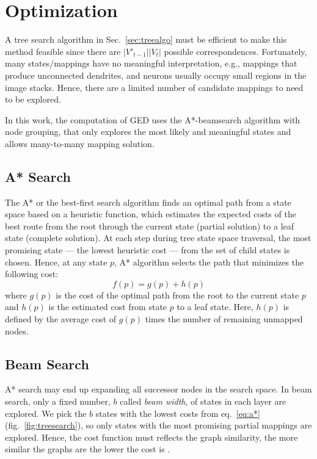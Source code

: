 \documentclass{article}
\begin{document}
\section{Optimization} 
A tree search algorithm in Sec.~\ref{sec:treealgo} must be efficient to make this method feasible since there are $|V'_{t-1}||V_t|$ possible correspondences. Fortunately, many states/mappings have no meaningful interpretation, e.g., mappings that produce unconnected dendrites, and neurons usually occupy small regions in the image stacks. Hence, there are a limited number of candidate mappings to need to be explored. 

In this work, the computation of GED uses the A*-beamsearch algorithm \cite{Neuhaus2006} with node grouping, that only explores the most likely and meaningful states and allows many-to-many mapping solution.

\subsection{A* Search}
The A* or the best-first search algorithm \cite{hart1968} finds an optimal path from a state space based on a heuristic function, which estimates the expected costs of the best route from the root through the current state (partial solution) to a leaf state (complete solution). At each step during tree state space traversal, the most promising state --- the lowest heuristic cost --- from the set of child states is chosen. Hence, at any state $p$, A* algorithm selects the path that minimizes the following cost:
\begin{equation} \label{eq:a*}
f(p) = g(p) + h(p)
\end{equation}
where $g(p)$ is the cost of the optimal path from the root to the current state $p$ and $h(p)$ is the estimated cost from state $p$ to a leaf state. Here, $h(p)$ is defined by the average cost of $g(p)$ times the number of remaining unmapped nodes.

\subsection{Beam Search}
A* search may end up expanding all successor nodes in the search space. In beam search, only a fixed number, $b$ called \emph{beam width}, of states in each layer are explored. We pick the $b$ states with the lowest costs from eq.~\ref{eq:a*} (fig.~\ref{fig:treesearch}), so only states with the most promising partial mappings are explored. Hence, the cost function must reflects the graph similarity, the more similar the graphs are the lower the cost is \cite{Neuhaus2006}.
\end{document}
